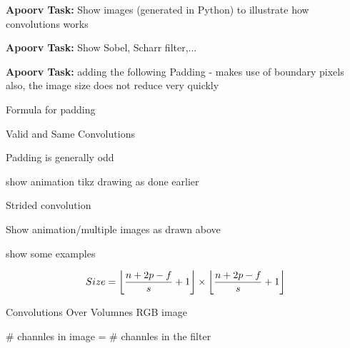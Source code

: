 \documentclass{beamer}
\newcommand{\red}[1]{{\color{red}\small \textbf{Apoorv Task:} #1}}
\DeclarePairedDelimiter\floor{\lfloor}{\rfloor}
\begin{document}
\begin{frame}
\red{Show images (generated in Python) to illustrate how convolutions works}
\end{frame}

\begin{frame}
\red{Show Sobel, Scharr filter,...}
\end{frame}

\begin{frame}
\red{adding the following}
Padding -  makes use of boundary pixels also, the image size does not reduce very quickly

Formula for padding

Valid and Same Convolutions

Padding is generally odd

show animation tikz drawing as done earlier
\end{frame}


\begin{frame}
Strided convolution

Show animation/multiple images as drawn above

show some examples 

\begin{align*}
Size = \floor*{\frac{n+2p-f}{s}+1} \times \floor*{\frac{n+2p-f}{s}+1}
\end{align*}
\end{frame}


\begin{frame}{Convolutions Over Volumnes}
RGB image

\# channles in image = \# channles in the filter
\end{frame}
\end{document}
